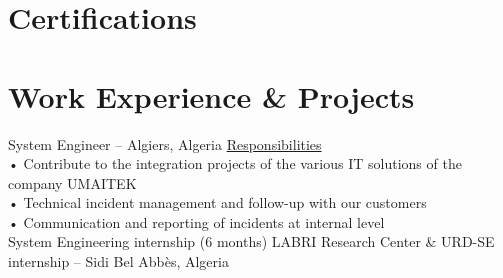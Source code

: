 \documentclass{cv}
\begin{document}
\section{Certifications}


\section{Work Experience \& Projects}

{System Engineer}
{ -- Algiers, Algeria\vspace{.2cm}}
{
    \underline {Responsibilities}\vspace{.2cm}\\
    • Contribute to the integration projects of the various IT solutions of the company UMAITEK\\
    • Technical incident management and follow-up with our customers\\
    • Communication and reporting of incidents at internal level\\

}
    {System Engineering internship (6 months)
    }
    {LABRI Research Center  \& URD-SE internship -- Sidi Bel Abbès, Algeria\vspace{.2cm}}
\end{document}
